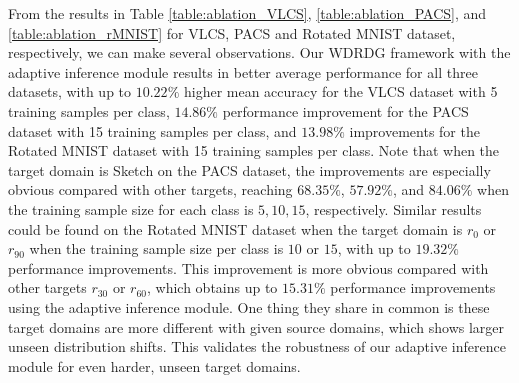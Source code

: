 \documentclass[journal]{IEEEtran}
\begin{document}
From the results in Table \ref{table:ablation_VLCS},  \ref{table:ablation_PACS}, and \ref{table:ablation_rMNIST} for VLCS, PACS and Rotated MNIST dataset, respectively, 
we can make several observations.
Our WDRDG framework with the adaptive inference module results in better average performance for all three datasets, with up to $10.22\%$ higher mean accuracy for the VLCS dataset with 5 training samples per class, $14.86\%$ performance improvement for the PACS dataset with 15 training samples per class, and $13.98\%$ improvements for the Rotated MNIST dataset with 15 training samples per class.
Note that when the target domain is Sketch on the PACS dataset, the improvements are especially obvious compared with other targets, reaching $68.35\%$, $57.92\%$, and $84.06\%$ when the training sample size for each class is $5,10,15$, respectively.
Similar results could be found on the Rotated MNIST dataset when the target domain is $r_{0}$ or $r_{90}$ when the training sample size per class is $10$ or $15$, with up to $19.32\%$ performance improvements. This improvement is more obvious compared with other targets $r_{30}$ or $r_{60}$, which obtains up to $15.31\%$ performance improvements using the adaptive inference module.
One thing they share in common is these target domains are more different with given source domains, which shows larger unseen distribution shifts. 
This validates the robustness of our adaptive inference module for even harder, unseen target domains.
\end{document}
